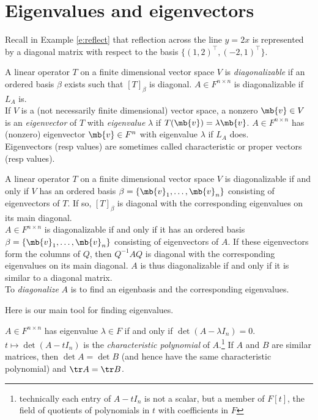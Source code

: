 \section{Eigenvalues and eigenvectors}
Recall in Example \ref{e:reflect} that reflection across the line $y=2x$ is represented by a diagonal matrix with respect to the basis $\{ (1,2)^\top,(-2,1)^\top \}$.
\begin{defn}
A linear operator $T$ on a finite dimensional vector space $V$ is \emph{diagonalizable} if an ordered basis $\beta$ exists such that $[T]_\beta$ is diagonal. $A \in F^{n \times n}$ is diagonalizable if $L_A$ is.\\
If $V$ is a (not necessarily finite dimensional) vector space, a nonzero $\mb{v}\in V$ is an \emph{eigenvector} of $T$ with \emph{eigenvalue} $\lambda$ if $T( \mb{v})= \lambda \mb{v}$. $A \in F^{n \times n}$ has (nonzero) eigenvector $\mb{v}\in F^n$ with eigenvalue $\lambda$ if $L_A$ does.\\
Eigenvectors (resp values) are sometimes called characteristic or proper vectors (resp values).
\end{defn}
\begin{lem}\label{l:diagze-basis}
A linear operator $T$ on a finite dimensional vector space $V$ is diagonalizable if and only if $V$ has an ordered basis $\beta = \{ \mb{v}_1, \ldots, \mb{v}_n \}$ consisting of eigenvectors of $T$. If so, $[T]_\beta$ is diagonal with the corresponding eigenvalues on its main diagonal.\\
$A \in F^{n \times n}$ is diagonalizable if and only if it has an ordered basis $\beta = \{ \mb{v}_1, \ldots, \mb{v}_n \}$ consisting of eigenvectors of $A$. If these eigenvectors form the columns of $Q$, then $Q^{-1}AQ$ is diagonal with the corresponding eigenvalues on its main diagonal. $A$ is thus diagonalizable if and only if it is similar to a diagonal matrix.\\
To \emph{diagonalize} $A$ is to find an eigenbasis and the corresponding eigenvalues.
\end{lem}
Here is our main tool for finding eigenvalues.
\begin{lem}\label{l:chr-poly}
$A \in F^{n \times n}$ has eigenvalue $\lambda \in F$ if and only if $\det (A- \lambda I_n)=0$. $t \mapsto \det (A-tI_n)$ is the \emph{characteristic polynomial} of $A$.\footnote{technically each entry of $A-tI_n$ is not a scalar, but a member of $F[t]$, the field of quotients of polynomials in $t$ with coefficients in $F$}
If $A$ and $B$ are similar matrices, then $\det A= \det B$ (and hence have the same characteristic polynomial) and $\tr A= \tr B$.
\end{lem}
